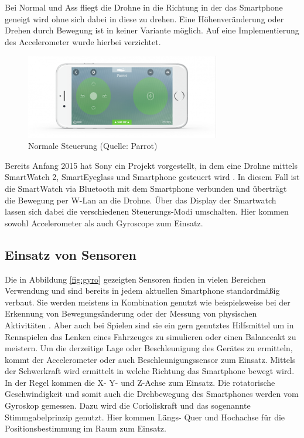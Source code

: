 \documentclass{article}
\begin{document}
Bei Normal und Ass fliegt die Drohne in die Richtung in der das Smartphone geneigt wird ohne sich dabei in diese zu drehen. Eine Höhenveränderung oder Drehen durch Bewegung ist in keiner Variante möglich. Auf eine Implementierung des Accelerometer wurde hierbei verzichtet.

\begin{figure}[htb]
\begin{minipage}[b]{1.0\linewidth}
  \centering
\centerline{\includegraphics[width= 85mm]{freeflight_mini.png}}
\end{minipage}
\caption{Normale Steuerung (Quelle: Parrot)}
\label{fig:freeflight}
\end{figure}

Bereits Anfang 2015 hat Sony ein Projekt vorgestellt, in dem eine Drohne mittels SmartWatch 2, SmartEyeglass und Smartphone gesteuert wird \cite{sonyflight}. In diesem Fall ist die SmartWatch via Bluetooth mit dem Smartphone verbunden und überträgt die Bewegung per W-Lan an die Drohne. Über das Display der Smartwatch lassen sich dabei die verschiedenen Steuerungs-Modi umschalten. Hier kommen sowohl Accelerometer als auch Gyroscope zum Einsatz.

\subsection{Einsatz von Sensoren}
Die in Abbildung \ref{fig:gyro} gezeigten Sensoren finden in vielen Bereichen Verwendung und sind bereits in jedem aktuellen Smartphone standardmäßig verbaut. 
Sie werden meistens in Kombination genutzt wie beispielsweise bei der Erkennung von Bewegungsänderung oder der Messung von physischen Aktivitäten \cite{wu2012classification}. Aber auch bei Spielen sind sie ein gern genutztes Hilfsmittel um in Rennspielen das Lenken eines Fahrzeuges zu simulieren oder einen Balanceakt zu meistern. 
Um die derzeitige Lage oder Beschleunigung des Gerätes zu ermitteln, kommt der Accelerometer oder auch Beschleunigungssensor zum Einsatz. Mittels der Schwerkraft wird ermittelt in welche Richtung das Smartphone bewegt wird. In der Regel kommen die X- Y- und Z-Achse zum Einsatz. Die rotatorische Geschwindigkeit und somit auch die Drehbewegung des Smartphones werden vom Gyroskop gemessen. Dazu wird die Corioliskraft und das sogenannte Stimmgabelprinzip genutzt. Hier kommen Längs- Quer und Hochachse für die Positionsbestimmung im Raum zum Einsatz.
\end{document}
